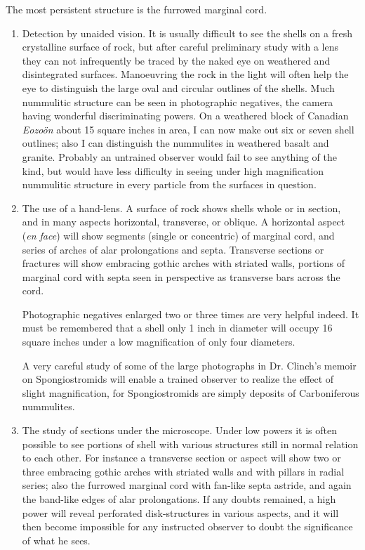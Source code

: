 \documentclass[a4paper, 12pt, oneside]{article}
\begin{document}
The most persistent structure is the furrowed marginal cord.
\begin{enumerate}
    \item Detection by unaided vision. It is usually difficult to see the shells on a fresh crystalline surface of rock, but after careful preliminary study with a lens they can not infrequently be traced by the naked eye on weathered and disintegrated surfaces. Manoeuvring the rock in the light will often help the eye to distinguish the large oval and circular outlines of the shells. Much nummulitic structure can be seen in photographic negatives, the camera having wonderful discriminating powers. On a weathered block of Canadian \emph{Eozoön} about 15 square inches in area, I can now make out six or seven shell outlines; also I can distinguish the nummulites in weathered basalt and granite. Probably an untrained observer would fail to see anything of the kind, but would have less difficulty in seeing under high magnification nummulitic structure in every particle from the surfaces in question.
    \item The use of a hand-lens. A surface of rock shows shells whole or in section, and in many aspects horizontal, transverse, or oblique. A horizontal aspect (\emph{en face}) will show segments (single or concentric) of marginal cord, and series of arches of alar prolongations and septa.
    Transverse sections or fractures will show embracing gothic arches with striated walls, portions of marginal cord with septa seen in perspective as transverse bars across the cord.

\hspace{5mm}Photographic negatives enlarged two or three times are very helpful indeed. It must be remembered that a shell only 1 inch in diameter will occupy 16 square inches under a low magnification of only four diameters.

\hspace{5mm}A very careful study of some of the large photographs in Dr. Clinch's memoir on Spongiostromids will enable a trained observer to realize the effect of slight magnification, for Spongiostromids are simply deposits of Carboniferous nummulites.
    \item The study of sections under the microscope. Under low powers it is often possible to see portions of shell with various structures still in normal relation to each other. For instance a transverse section or aspect will show two or three embracing gothic arches with striated walls and with pillars in radial series; also the furrowed marginal cord with fan-like septa astride, and again the band-like edges of alar prolongations. If any doubts remained, a high power will reveal perforated disk-structures in various aspects, and it will then become impossible for any instructed observer to doubt the significance of what he sees.
\end{enumerate}
\end{document}
